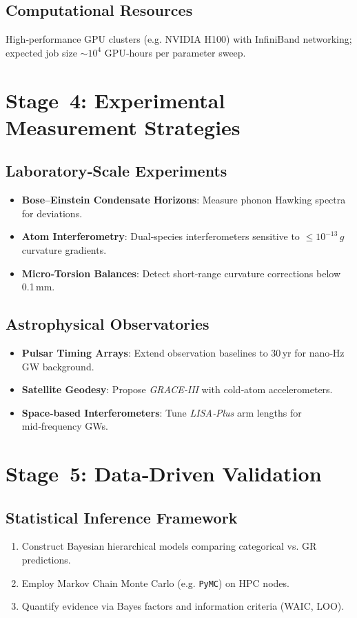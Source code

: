 \documentclass[11pt]{article}
\begin{document}
\subsection{Computational Resources}
High‑performance GPU clusters (e.g. NVIDIA H100) with InfiniBand networking; expected job size \(\sim10^{4}\) GPU‑hours per parameter sweep.

\section{Stage 4: Experimental Measurement Strategies}
\subsection{Laboratory‑Scale Experiments}
\begin{itemize}
  \item \textbf{Bose–Einstein Condensate Horizons}: Measure phonon Hawking spectra for deviations.
  \item \textbf{Atom Interferometry}: Dual‑species interferometers sensitive to \(\le10^{-13}\,g\) curvature gradients.
  \item \textbf{Micro‑Torsion Balances}: Detect short‑range curvature corrections below 0.1\,mm.
\end{itemize}

\subsection{Astrophysical Observatories}
\begin{itemize}
  \item \textbf{Pulsar Timing Arrays}: Extend observation baselines to 30\,yr for nano‑Hz GW background.
  \item \textbf{Satellite Geodesy}: Propose \textit{GRACE‑III} with cold‑atom accelerometers.
  \item \textbf{Space‑based Interferometers}: Tune \textit{LISA‑Plus} arm lengths for mid‑frequency GWs.
\end{itemize}

\section{Stage 5: Data‑Driven Validation}
\subsection{Statistical Inference Framework}
\begin{enumerate}
  \item Construct Bayesian hierarchical models comparing categorical vs. GR predictions.
  \item Employ Markov Chain Monte Carlo (e.g. \texttt{PyMC}) on HPC nodes.
  \item Quantify evidence via Bayes factors and information criteria (WAIC, LOO).
\end{enumerate}
\end{document}

